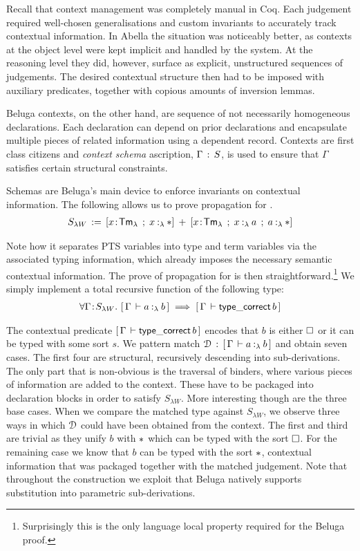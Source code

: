 Recall that context management was completely manual in Coq.
Each judgement required well-chosen generalisations and custom invariants to accurately track contextual information.
In Abella the situation was noticeably better, as contexts at the object level were kept implicit and handled by the system.
At the reasoning level they did, however, surface as explicit, unstructured sequences of judgements.
The desired contextual structure then had to be imposed with auxiliary predicates, together with copious amounts of inversion lemmas.

Beluga contexts, on the other hand, are sequence of not necessarily homogeneous declarations.
Each declaration can depend on prior declarations and encapsulate multiple pieces of related information using a dependent record.
Contexts are first class citizens and \emph{context schema} ascription, $\Gamma \mathrel{\, : \,} S$, is used to ensure that $\Gamma$ satisfies certain structural constraints.

Schemas are Beluga's main device to enforce invariants on contextual information.
The following allows us to prove propagation for \SysL.
\begin{align*}
  S_{\lambda W} \eqdef [x\of\TmL \mrel{;} \typingLh{x}{\Prp}] \mrel{+} [x\of\TmL \mrel{;} \typingLh{x}{a} \mrel{;} \typingLh{a}{\Prp}]
\end{align*}

Note how it separates PTS variables into type and term variables via the associated typing information, which already imposes the necessary semantic contextual information.
The prove of propagation for \SysL is then straightforward.\footnote{Surprisingly this is the only language local property required for the Beluga proof.}
We simply implement a total recursive function of the following type:
\begin{align*}
  \forall \Gamma \!:\! S_{\lambda W}.\,\, [\,\Gamma\,\vdash a \mathbin{:_{\lambda}} b\,] \implies [\,\Gamma\,\vdash \mathsf{type\_correct}\,b\,]
\end{align*}

The contextual predicate $[\,\Gamma\,\vdash \mathsf{type\_correct}\,b\,]$ encodes that $b$ is either $\square$ or it can be typed with some sort $s$.
We pattern match $\mathcal{D} \mathrel{\, : \,} [\,\Gamma\,\vdash a \mathbin{:_{\lambda}} b\,]$ and obtain seven cases.
The first four are structural, recursively descending into sub-derivations.
The only part that is non-obvious is the traversal of binders, where various pieces of information are added to the context.
These have to be packaged into declaration blocks in order to satisfy $S_{\lambda W}$.
More interesting though are the three base cases.
When we compare the matched type against $S_{\lambda W}$, we observe three ways in which $\mathcal{D}$ could have been obtained from the context.
The first and third are trivial as they unify $b$ with $\Prp$ which can be typed with the sort $\square$.
For the remaining case we know that $b$ can be typed with the sort $\Prp$,  contextual information that was packaged together with the matched judgement.
Note that throughout the construction we exploit that Beluga natively supports substitution into parametric sub-derivations.

